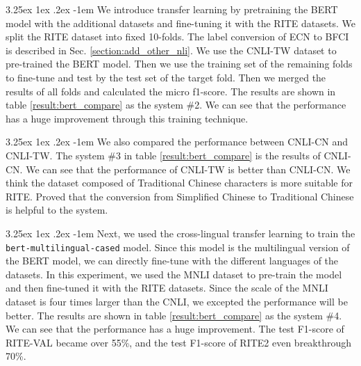 \documentclass[12pt]{article}
\makeatletter
\renewcommand\paragraph{\@startsection{paragraph}{5}{\z@}%
  {3.25ex \@plus1ex \@minus.2ex}%
  {-1em}%
  {\normalfont\normalsize\bfseries}}
\makeatother
\begin{document}
\begin{CJK*}{UTF8}{bkai}
\begin{spacing}{1.77}
\paragraph{}
We introduce transfer learning by pretraining the BERT model with the additional datasets and fine-tuning it with the RITE datasets. We split the RITE dataset into fixed 10-folds. The label conversion of ECN to BFCI is described in Sec. \ref{section:add_other_nli}. We use the CNLI-TW dataset to pre-trained the BERT model. Then we use the training set of the remaining folds to fine-tune and test by the test set of the target fold. Then we merged the results of all folds and calculated the micro f1-score. The results are shown in table \ref{result:bert_compare} as the system \#2. We can see that the performance has a huge improvement through this training technique.

\paragraph{}
We also compared the performance between CNLI-CN and CNLI-TW. The system \#3 in table \ref{result:bert_compare} is the results of CNLI-CN. We can see that the performance of CNLI-TW is better than CNLI-CN. We think the dataset composed of Traditional Chinese characters is more suitable for RITE. Proved that the conversion from Simplified Chinese to Traditional Chinese is helpful to the system.

\paragraph{}
Next, we used the cross-lingual transfer learning to train the \texttt{bert-multilingual-cased} model. Since this model is the multilingual version of the BERT model, we can directly fine-tune with the different languages of the datasets. In this experiment, we used the MNLI dataset to pre-train the model and then fine-tuned it with the RITE datasets. Since the scale of the MNLI dataset is four times larger than the CNLI, we excepted the performance will be better. The results are shown in table \ref{result:bert_compare} as the system \#4. We can see that the performance has a huge improvement. The test F1-score of RITE-VAL became over 55\%, and the test F1-score of RITE2 even breakthrough 70\%.


\end{spacing}
\end{CJK*}
\end{document}
